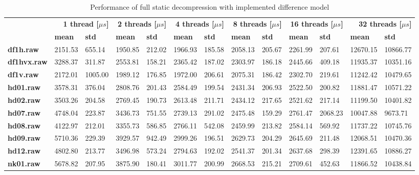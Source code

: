 \begin{table}
\centering
\small
\begin{tabular}{l|ll|ll|ll|ll|ll|ll}
    & \multicolumn{2}{r|}{\textbf{1 thread [$\mu s$]}} & \multicolumn{2}{r|}{\textbf{2 threads [$\mu s$]}} & \multicolumn{2}{r|}{\textbf{4 threads [$\mu s$]}} & \multicolumn{2}{r|}{\textbf{8 threads [$\mu s$]}} & \multicolumn{2}{r|}{\textbf{16 threads [$\mu s$]}} & \multicolumn{2}{r}{\textbf{32 threads [$\mu s$]}} \\
    & \textbf{mean} & \textbf{std} & \textbf{mean} & \textbf{std} & \textbf{mean} & \textbf{std} & \textbf{mean} & \textbf{std} & \textbf{mean} & \textbf{std} & \textbf{mean} & \textbf{std} \\
\hline
    \textbf{df1h.raw} & 2151.53 & 655.14 & 1950.85 & 212.02 & 1966.93 & 185.58 & 2058.13 & 205.67 & 2261.99 & 207.61 & 12670.15 & 10866.77 \\
    \textbf{df1hvx.raw} & 3288.37 & 311.87 & 2553.81 & 158.21 & 2365.42 & 187.02 & 2303.97 & 186.18 & 2445.66 & 409.18 & 11935.37 & 10351.16 \\
    \textbf{df1v.raw} & 2172.01 & 1005.00 & 1989.12 & 176.85 & 1972.00 & 206.61 & 2075.31 & 186.42 & 2302.70 & 219.61 & 11242.42 & 10479.65 \\
    \textbf{hd01.raw} & 3578.31 & 376.04 & 2808.76 & 201.43 & 2584.49 & 199.54 & 2431.34 & 206.93 & 2522.50 & 200.82 & 11881.47 & 10571.22 \\
    \textbf{hd02.raw} & 3503.26 & 204.58 & 2769.45 & 190.73 & 2613.48 & 211.71 & 2434.12 & 217.65 & 2521.62 & 217.14 & 11199.50 & 10401.82 \\
    \textbf{hd07.raw} & 4748.04 & 223.87 & 3436.73 & 751.55 & 2739.13 & 291.02 & 2475.48 & 159.29 & 2761.47 & 2068.23 & 10047.88 & 9673.71 \\
    \textbf{hd08.raw} & 4122.97 & 212.01 & 3355.73 & 586.85 & 2766.11 & 542.08 & 2459.99 & 213.82 & 2584.14 & 569.92 & 11737.22 & 10745.76 \\
    \textbf{hd09.raw} & 5710.36 & 229.39 & 3929.57 & 942.49 & 2999.26 & 196.51 & 2629.73 & 204.29 & 2645.69 & 211.48 & 12068.51 & 10470.36 \\
    \textbf{hd12.raw} & 4802.80 & 213.77 & 3496.98 & 573.24 & 2794.63 & 192.02 & 2541.37 & 201.34 & 2637.68 & 298.39 & 12391.65 & 10886.27 \\
    \textbf{nk01.raw} & 5678.82 & 207.95 & 3875.90 & 180.41 & 3011.77 & 200.99 & 2668.53 & 215.21 & 2709.61 & 452.63 & 11866.52 & 10438.84 \\
\end{tabular}
\caption{Performance of full static decompression with implemented difference model}
\end{table}
